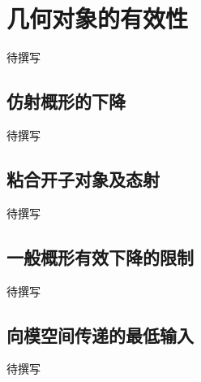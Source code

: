 
% 
% 

\section{几何对象的有效性}
\label{g5:sec:1604}

待撰写

\subsection{仿射概形的下降}
\label{g5:subsec:1604:01}
待撰写

\subsection{粘合开子对象及态射}
\label{g5:subsec:1604:02}
待撰写

\subsection{一般概形有效下降的限制}
\label{g5:subsec:1604:03}
待撰写

\subsection{向模空间传递的最低输入}
\label{g5:subsec:1604:04}
待撰写
